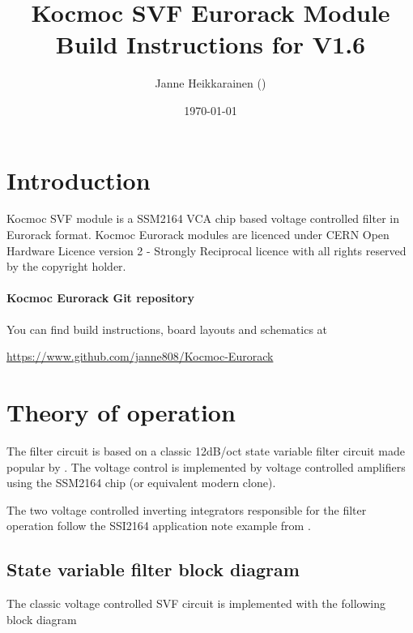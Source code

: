 \documentclass{article}
\title{Kocmoc SVF Eurorack Module Build Instructions for V1.6}
\author{Janne Heikkarainen (\email{janne808@radiofreerobotron.net}) \\
	}
\date{\today}
\begin{document}
\maketitle

\section{Introduction}
Kocmoc SVF module is a SSM2164 VCA chip based voltage controlled filter in Eurorack format. Kocmoc Eurorack modules are licenced under CERN Open Hardware Licence version 2 - Strongly Reciprocal licence with all rights reserved by the copyright holder. \newline

\paragraph{Kocmoc Eurorack Git repository}
\begin{flushleft}
You can find build instructions, board layouts and schematics at \newline
\end{flushleft}
\begin{center}
\href{https://www.github.com/janne808/Kocmoc-Eurorack}{https://www.github.com/janne808/Kocmoc-Eurorack}
\end{center}

\section{Theory of operation} \label{theoryofoperation}

The filter circuit is based on a classic 12dB/oct state variable filter circuit made popular by \cite{chamberlin}. The voltage control is implemented by voltage controlled amplifiers using the SSM2164 chip (or equivalent modern clone).\newline


The two voltage controlled inverting integrators responsible for the filter operation follow the SSI2164 application note example from \cite{allaert}.\newline

\subsection{State variable filter block diagram}

The classic voltage controlled SVF circuit is implemented with the following block diagram
\end{document}
